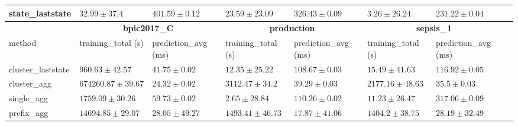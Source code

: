 \documentclass[twoside,11pt]{Latex/Classes/PhDthesisPSnPDF}
\begin{document}
\begin{table}[h]
{\begin{tabular}{llllllll}
				state\_laststate & $32.99 \pm 37.4$ & $401.59 \pm 0.12$ & $23.59 \pm 23.09$ & $326.43 \pm 0.09$ & $3.26 \pm 26.24$ & $231.22 \pm 0.04$ \\ 
				\bottomrule
				\toprule
				& \multicolumn{2}{c}{{\bfseries bpic2017\_C}} & \multicolumn{2}{c}{{\bfseries production}} & \multicolumn{2}{c}{{\bfseries sepsis\_1}} \\ \cmidrule(lr){2-3} \cmidrule(lr){4-5} \cmidrule(lr){6-7}
				method  & training\_total (s) & prediction\_avg (ms) & training\_total (s) & prediction\_avg (ms) & training\_total (s) & prediction\_avg (ms) \\ \midrule
				cluster\_laststate & $960.63 \pm 42.57$ & $41.75 \pm 0.02$ & $12.35 \pm 25.22$ & $108.67 \pm 0.03$ & $15.49 \pm 41.63$ & $116.92 \pm 0.05$ \\ 
				cluster\_agg & $674260.87 \pm 39.67$ & $\mathbf{24.32 \pm 0.02}$ & $3112.47 \pm 34.2$ & $39.29 \pm 0.03$ & $2177.16 \pm 48.63$ & $35.5 \pm 0.03$ \\ 
				single\_agg & $1759.09 \pm 30.26$ & $59.73 \pm 0.02$ & $2.65 \pm 28.84$ & $110.26 \pm 0.02$ & $11.23 \pm 26.47$ & $317.06 \pm 0.09$ \\ 
				prefix\_agg & $14694.85 \pm 29.07$ & $28.05 \pm 49.27$ & $1493.41 \pm 46.73$ & $\mathbf{17.87 \pm 41.06}$ & $1404.2 \pm 38.75$ & $28.19 \pm 32.49$ \\ 
				

\end{tabular}}
\end{table}
\end{document}
